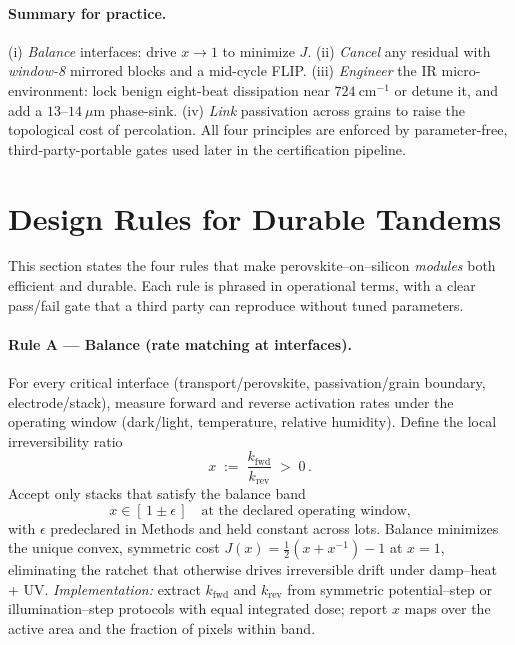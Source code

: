 \documentclass[12pt]{article}
\begin{document}
\paragraph{Summary for practice.}
(i) \emph{Balance} interfaces: drive $x\to 1$ to minimize $J$. (ii) \emph{Cancel} any residual with \emph{window-8} mirrored blocks and a mid-cycle FLIP. (iii) \emph{Engineer} the IR micro-environment: lock benign eight-beat dissipation near $724~\mathrm{cm}^{-1}$ or detune it, and add a $13$–$14~\mu\mathrm{m}$ phase-sink. (iv) \emph{Link} passivation across grains to raise the topological cost of percolation. All four principles are enforced by parameter-free, third-party-portable gates used later in the certification pipeline.

\section{Design Rules for Durable Tandems}

This section states the four rules that make perovskite–on–silicon \emph{modules} both efficient and durable. Each rule is phrased in operational terms, with a clear pass/fail gate that a third party can reproduce without tuned parameters.

\paragraph{Rule A — Balance (rate matching at interfaces).}
For every critical interface (transport/perovskite, passivation/grain boundary, electrode/stack), measure forward and reverse activation rates under the operating window (dark/light, temperature, relative humidity). Define the local irreversibility ratio
\begin{equation}
x \;:=\; \frac{k_{\mathrm{fwd}}}{k_{\mathrm{rev}}} \;>\; 0 \, .
\end{equation}
Accept only stacks that satisfy the balance band
\begin{equation}
x \in [\,1\pm\epsilon\,]
\quad\text{at the declared operating window,}
\end{equation}
with $\epsilon$ predeclared in Methods and held constant across lots. Balance minimizes the unique convex, symmetric cost $J(x)=\tfrac12(x+x^{-1})-1$ at $x=1$, eliminating the ratchet that otherwise drives irreversible drift under damp–heat + UV. \emph{Implementation:} extract $k_{\mathrm{fwd}}$ and $k_{\mathrm{rev}}$ from symmetric potential–step or illumination–step protocols with equal integrated dose; report $x$ maps over the active area and the fraction of pixels within band.
\end{document}
